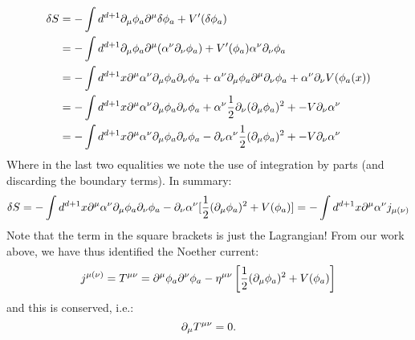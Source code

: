\begin{equation}
    \begin{split}
        \delta S &= -\int d^{d+1} \partial_\mu \phi_a \partial^\mu \delta \phi_a + V'(\delta\phi_a) 
        \\ &= -\int d^{d+1} \partial_\mu \phi_a \partial^\mu (\alpha^\nu \partial_\nu \phi_a) + V'(\phi_a)\alpha^\nu \partial_\nu \phi_a
        \\ &= -\int d^{d+1}x \partial^\mu \alpha^\nu \partial_\mu \phi_a \partial_\nu \phi_a + \alpha^\nu \partial_\mu \phi_a \partial^\mu \partial_\nu \phi_a + \alpha^\nu \partial_\nu V(\phi_a(x))
        \\ &= -\int d^{d+1}x \partial^\mu \alpha^\nu \partial_\mu \phi_a \partial_\nu \phi_a + \alpha^\nu \frac{1}{2}\partial_\nu(\partial_\mu \phi_a)^2 + -V \partial_\nu \alpha^\nu
        \\ &= -\int d^{d+1}x \partial^\mu \alpha^\nu \partial_\mu \phi_a \partial_\nu \phi_a - \partial_\nu \alpha^\nu \frac{1}{2}(\partial_\mu \phi_a)^2 + -V \partial_\nu \alpha^\nu
    \end{split}
\end{equation}
Where in the last two equalities we note the use of integration by parts (and discarding the boundary terms). In summary:
\begin{equation}
    \delta S = -\int d^{d+1}x \partial^\mu \alpha ^\nu \partial_\mu \phi_a \partial_\nu \phi_a - \partial_\nu \alpha^\nu [\frac{1}{2}(\partial_\mu \phi_a)^2 + V(\phi_a)] = -\int d^{d+1}x \partial^\mu \alpha^\nu j_{\mu(\nu)}
\end{equation}
Note that the term in the square brackets is just the Lagrangian! From our work above, we have thus identified the Noether current:
\begin{equation}
    j^{\mu(\nu)} = T^{\mu\nu} = \partial^\mu \phi_a \partial^\nu \phi_a - \eta^{\mu\nu}\left[\frac{1}{2}(\partial_\mu \phi_a)^2 + V(\phi_a)\right]
\end{equation}
and this is conserved, i.e.:
\begin{equation}
    \partial_\mu T^{\mu\nu} = 0.
\end{equation}

